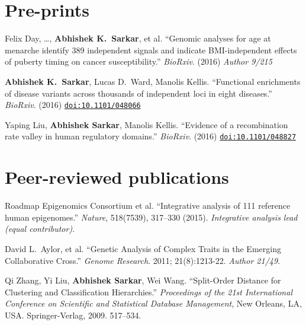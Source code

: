 \documentclass{article}
\begin{document}
\section*{Pre-prints}
\begin{henum}
\item Felix Day, \ldots, \textbf{Abhishek K.\ Sarkar}, et al. ``Genomic
  analyses for age at menarche identify 389 independent signals and indicate
  BMI-independent effects of puberty timing on cancer susceptibility.''
  \emph{BioRxiv}. (2016) \emph{Author 9/215}
\item \textbf{Abhishek K.\ Sarkar}, Lucas D.\ Ward, Manolis Kellis.
  ``Functional enrichments of disease variants across thousands of independent
  loci in eight diseases.'' \emph{BioRxiv}. (2016)
  \href{http://biorxiv.org/content/early/2016/04/11/048066}{\texttt{doi:10.1101/048066}}
\item Yaping Liu, \textbf{Abhishek Sarkar}, Manolis Kellis. ``Evidence of a
  recombination rate valley in human regulatory domains.'' \emph{BioRxiv}.
  (2016) \href{http://biorxiv.org/content/early/2016/04/15/048827}{\texttt{doi:10.1101/048827}}
\end{henum}

\section*{Peer-reviewed publications}
\begin{henum}
\item Roadmap Epigenomics Consortium et al. ``Integrative analysis of 111
  reference human epigenomes.'' \emph{Nature}, 518(7539), 317–330 (2015).
  \emph{Integrative analysis lead (equal contributor)}.
\item David L.\ Aylor, et al. ``Genetic Analysis of Complex Traits in the
  Emerging Collaborative Cross.'' \emph{Genome Research}. 2011; 21(8):1213-22.
  \emph{Author 21/49}.
\item Qi Zhang, Yi Liu, \textbf{Abhishek Sarkar}, Wei Wang. ``Split-Order
  Distance for Clustering and Classification Hierarchies.'' \emph{Proceedings
    of the 21st International Conference on Scientific and Statistical Database
    Management}, New Orleans, LA, USA. Springer-Verlag, 2009. 517–534.
\end{henum}
\end{document}
